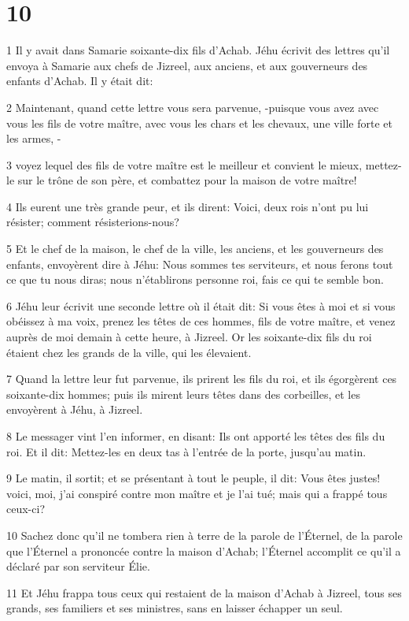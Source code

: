 \chapter{10}

\par 1 Il y avait dans Samarie soixante-dix fils d'Achab. Jéhu écrivit des lettres qu'il envoya à Samarie aux chefs de Jizreel, aux anciens, et aux gouverneurs des enfants d'Achab. Il y était dit:
\par 2 Maintenant, quand cette lettre vous sera parvenue, -puisque vous avez avec vous les fils de votre maître, avec vous les chars et les chevaux, une ville forte et les armes, -
\par 3 voyez lequel des fils de votre maître est le meilleur et convient le mieux, mettez-le sur le trône de son père, et combattez pour la maison de votre maître!
\par 4 Ils eurent une très grande peur, et ils dirent: Voici, deux rois n'ont pu lui résister; comment résisterions-nous?
\par 5 Et le chef de la maison, le chef de la ville, les anciens, et les gouverneurs des enfants, envoyèrent dire à Jéhu: Nous sommes tes serviteurs, et nous ferons tout ce que tu nous diras; nous n'établirons personne roi, fais ce qui te semble bon.
\par 6 Jéhu leur écrivit une seconde lettre où il était dit: Si vous êtes à moi et si vous obéissez à ma voix, prenez les têtes de ces hommes, fils de votre maître, et venez auprès de moi demain à cette heure, à Jizreel. Or les soixante-dix fils du roi étaient chez les grands de la ville, qui les élevaient.
\par 7 Quand la lettre leur fut parvenue, ils prirent les fils du roi, et ils égorgèrent ces soixante-dix hommes; puis ils mirent leurs têtes dans des corbeilles, et les envoyèrent à Jéhu, à Jizreel.
\par 8 Le messager vint l'en informer, en disant: Ils ont apporté les têtes des fils du roi. Et il dit: Mettez-les en deux tas à l'entrée de la porte, jusqu'au matin.
\par 9 Le matin, il sortit; et se présentant à tout le peuple, il dit: Vous êtes justes! voici, moi, j'ai conspiré contre mon maître et je l'ai tué; mais qui a frappé tous ceux-ci?
\par 10 Sachez donc qu'il ne tombera rien à terre de la parole de l'Éternel, de la parole que l'Éternel a prononcée contre la maison d'Achab; l'Éternel accomplit ce qu'il a déclaré par son serviteur Élie.
\par 11 Et Jéhu frappa tous ceux qui restaient de la maison d'Achab à Jizreel, tous ses grands, ses familiers et ses ministres, sans en laisser échapper un seul.
